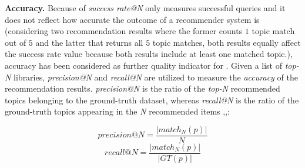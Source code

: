 \noindent \textbf{Accuracy.} Because of \emph{success rate@N} only measures successful queries and it does not reflect how accurate the outcome of a recommender system is
(\eg considering two recommendation results where the former counts $1$ topic match out of $5$ and the latter that returns all $5$ topic matches,  both results equally affect the success rate value because both results include at least one matched topic.), accuracy has been considered as further quality indicator for \TF. Given a list of \emph{top-N} libraries, \emph{precision@N} and \emph{recall@N} are utilized to measure the \emph{accuracy} of the recommendation results. \emph{precision@N} is the ratio of the \emph{top-N} recommended topics belonging to the ground-truth dataset, whereas \emph{recall@N} is the ratio of the ground-truth topics appearing in the \emph{N} recommended items \cite{Nguyen:2019:FRS:3339505.3339636},\cite{DiNoia:2012:LOD:2362499.2362501},\cite{Davis:2006:RPR:1143844.1143874}:



\begin{equation} \label{eqn:Precision}
precision@N = \frac{ \left | match_{N}(p) \right | }{N}
\end{equation}
\begin{equation} \label{eqn:Recall}
recall@N = \frac{ \left | match_{N}(p) \right | }{\left | GT(p) \right |}
\end{equation}

